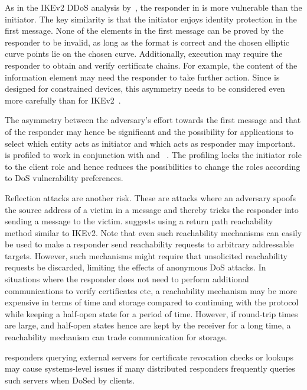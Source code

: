 \documentclass[runningheads]{llncs}
\begin{document}
As in the IKEv2 DDoS analysis by~\cite{rfc8019}, the responder in \mEdhoc{}
is more vulnerable than the initiator.
%
The key similarity is that the initiator enjoys identity protection in the
first message.
%
None of the elements in the first \mEdhoc{} message can be proved by the
responder to be invalid, as long as the format is correct and the chosen
elliptic curve points lie on the chosen curve.
%
Additionally, execution may require the responder to obtain and verify
certificate chains.
%
For example, the content of the \mADone{} information element may need the
responder to take further action.
%
Since \mEdhoc{} is designed for constrained devices, this asymmetry needs to be
considered even more carefully than for IKEv2~\cite{rfc8019}.
%

The asymmetry between the adversary's effort towards the first message and that
of the responder may hence be significant and the possibility for applications
to select which entity acts as initiator and which acts as responder may
important.
%
\mEdhoc{} is profiled to work in conjunction with \mCoap{} and
\mOscore{}~\cite{ietf-core-oscore-edhoc-03}.
%
The profiling locks the \mEdhoc{} initiator role to the \mCoap{} client role and
hence reduces the possibilities to change the \mEdhoc{} roles according to DoS
vulnerability preferences.
%

Reflection attacks are another risk.
%
These are attacks where an adversary spoofs the source address of a victim in a
message and thereby tricks the responder into sending a message to the victim.
%
\mEdhoc{} suggests using a return path reachability method similar to IKEv2.
%
Note that even such reachability mechanisms can easily be used to make a
responder send reachability requests to arbitrary addressable targets.
%
However, such mechanisms might require that unsolicited reachability 
requests be
discarded, limiting the effects of anonymous DoS attacks.
%
In situations where the responder does not need to perform additional
communications to verify certificates etc, a reachability mechanism may be more
expensive in terms of time and storage compared to continuing with the protocol
while keeping a half-open state for a period of time.
%
However, if round-trip times are large, and half-open states hence are kept by
the receiver for a long time, a reachability mechanism can trade communication
for storage.
%

\mEdhoc{} responders querying external servers for certificate revocation checks
or lookups may cause systems-level issues if many distributed \mEdhoc{}
responders frequently queries such servers when DoSed by clients.
%
\end{document}
